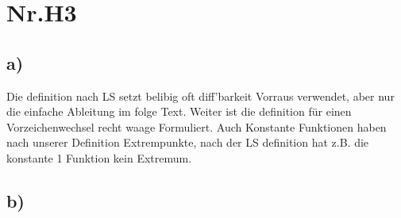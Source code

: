 \documentclass[12pt,a4paper,oneside,ngerman]{article} %
\begin{document}
\section*{Nr.H3}

\subsection*{a)}

Die definition nach LS setzt belibig oft diff'barkeit Vorraus verwendet,
aber nur die einfache Ableitung im folge Text.
Weiter ist die definition für einen Vorzeichenwechsel recht waage Formuliert.
Auch Konstante Funktionen haben nach unserer Definition Extrempunkte, nach der LS definition
hat z.B. die konstante 1 Funktion kein Extremum.


\subsection*{b)}
	
\end{document}
